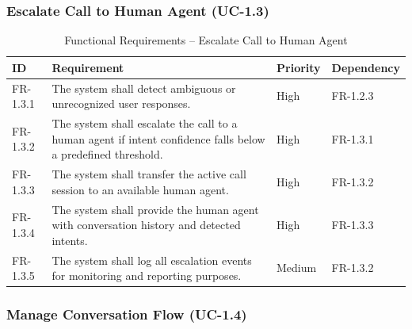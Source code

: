 \documentclass[12pt,a4paper]{report}
\begin{document}
\subsubsection{Escalate Call to Human Agent (UC-1.3)}

\begin{table}[H]
\centering
\caption{Functional Requirements – Escalate Call to Human Agent}
\begin{tabularx}{\textwidth}{|l|X|l|l|}
\hline
\textbf{ID} & \textbf{Requirement} & \textbf{Priority} & \textbf{Dependency} \\ \hline

FR-1.3.1 & The system shall detect ambiguous or unrecognized user responses. & High & FR-1.2.3 \\ \hline

FR-1.3.2 & The system shall escalate the call to a human agent if intent confidence falls below a predefined threshold. & High & FR-1.3.1 \\ \hline

FR-1.3.3 & The system shall transfer the active call session to an available human agent. & High & FR-1.3.2 \\ \hline

FR-1.3.4 & The system shall provide the human agent with conversation history and detected intents. & High & FR-1.3.3 \\ \hline

FR-1.3.5 & The system shall log all escalation events for monitoring and reporting purposes. & Medium & FR-1.3.2 \\ \hline

\end{tabularx}
\end{table}
\subsubsection{Manage Conversation Flow (UC-1.4)}
\end{document}
